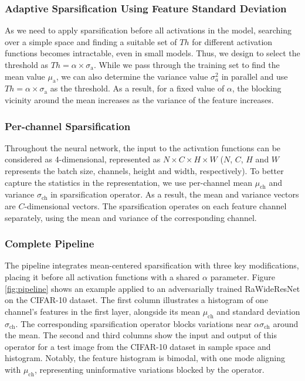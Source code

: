 \documentclass[conference]{IEEEtran}
\begin{document}
\subsubsection{Adaptive Sparsification Using Feature Standard Deviation}
As we need to apply sparsification before all activations in the model, searching over a simple space and finding a suitable set of $Th$ for different activation functions becomes intractable, even in small models. Thus, we design to select the threshold as $Th = \alpha \times \sigma_{\mathrm{a}}$. While we pass through the training set to find the mean value $\mu_{\mathrm{a}}$, we can also determine the variance value $\sigma_a^2$ in parallel and use $Th = \alpha \times \sigma_{\mathrm{a}}$ as the threshold. As a result, for a fixed value of $\alpha$, the blocking vicinity around the mean increases as the variance of the feature increases.

\subsubsection{Per-channel Sparsification}
Throughout the neural network, the input to the activation functions can be considered as 4-dimensional, represented as $N\times C\times H\times W$ ($N$, $C$, $H$ and $W$ represents the batch size, channels, height and width, respectively). To better capture the statistics in the representation, we use per-channel mean $\mu_\mathrm{ch}$ and variance $\sigma_\mathrm{ch}$ in sparsification operator. As a result, the mean and variance vectors are $C$-dimensional vectors. The sparsification operates on each feature channel separately, using the mean and variance of the corresponding channel.

\subsubsection{Complete Pipeline}
The \sys pipeline integrates mean-centered sparsification with three key modifications, placing it before all activation functions with a shared $\alpha$ parameter. Figure \ref{fig:pipeline} shows an example applied to an adversarially trained RaWideResNet on the CIFAR-10 dataset. The first column illustrates a histogram of one channel's features in the first layer, alongside its mean $\mu_{\mathrm{ch}}$ and standard deviation $\sigma_{\mathrm{ch}}$. The corresponding sparsification operator blocks variations near $\alpha\sigma_{\mathrm{ch}}$ around the mean. The second and third columns show the input and output of this operator for a test image from the CIFAR-10 dataset in sample space and histogram. Notably, the feature histogram is bimodal, with one mode aligning with $\mu_{\mathrm{ch}}$, representing uninformative variations blocked by the operator.
\end{document}
